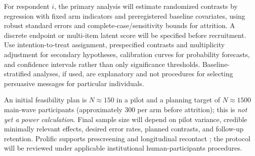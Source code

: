 \documentclass[journal,10pt]{IEEEtran}
\begin{document}
For respondent $i$, the primary analysis will estimate randomized contrasts by regression with fixed arm indicators and preregistered baseline covariates, using robust standard errors and complete-case/sensitivity bounds for attrition. A discrete endpoint or multi-item latent score will be specified before recruitment. Use intention-to-treat assignment, prespecified contrasts and multiplicity adjustment for secondary hypotheses, calibration curves for probability forecasts, and confidence intervals rather than only significance thresholds. Baseline-stratified analyses, if used, are explanatory and not procedures for selecting persuasive messages for particular individuals.

An initial feasibility plan is $N\approx150$ in a pilot and a planning target of $N\approx1500$ main-wave participants (approximately 300 per arm before attrition); this is \emph{not yet a power calculation}. Final sample size will depend on pilot variance, credible minimally relevant effects, desired error rates, planned contrasts, and follow-up retention. Prolific supports prescreening and longitudinal recontact \cite{prolific2026}; the protocol will be reviewed under applicable institutional human-participants procedures.
\end{document}
